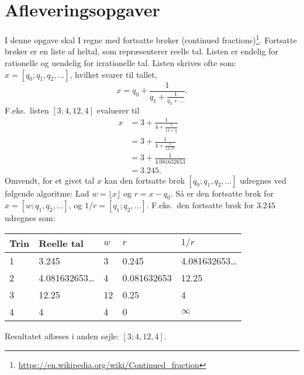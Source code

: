 \documentclass[a4paper,12pt]{article}
\begin{document}
\section*{Afleveringsopgaver}
I denne opgave skal I regne med fortsatte brøker (continued fractions)\footnote{\url{https://en.wikipedia.org/wiki/Continued_fraction}}. Fortsatte brøker er en liste af heltal, som repræsenterer reelle tal. Listen er endelig for rationelle og uendelig for irrationelle tal. Listen skrives ofte som:
$x = [q_0; q_1, q_2, \ldots]$, hvilket svarer til tallet,
\begin{equation}
  x = q_0 + \frac{1}{q_1 + \frac{1}{q_2 + \dots}}.
\end{equation}
F.eks.\ listen $[3;4, 12, 4]$ evaluerer til
\begin{align}
  x &= 3 + \frac{1}{4 + \frac{1}{12 + \frac{1}{4}}}
  \\&=  3 + \frac{1}{4 + \frac{1}{12.25}}
  \\&=  3 + \frac{1}{4.081632653}
  \\&=  3.245.
\end{align}
Omvendt, for et givet tal $x$ kan den fortsatte brøk $[q_0; q_1, q_2, \ldots]$ udregnes ved følgende algoritme: Lad $w = \lfloor x \rfloor$ og $r = x - q_0$. Så er den fortsatte brøk for $x = [w; q_1, q_2, \ldots]$, og $1/r = [q_1; q_2, \ldots]$. F.eks.\ den fortsatte brøk for $3.245$ udregnes som:
\begin{center}
  \begin{tabular}{|l|l|l|l|l|}
    \hline
    Trin & Reelle tal & $w$ & $r$ & $1/r$\\
    \hline
    1 & 3.245 & 3 & 0.245 & 4.081632653\ldots\\
    2 & 4.081632653\ldots & 4 & 0.081632653 & 12.25\\
    3 & 12.25 & 12 & 0.25 & 4\\
    4 & 4 & 4 & 0 & $\infty$\\
    \hline
  \end{tabular}
\end{center}
Resultatet aflæses i anden søjle: $[3; 4, 12, 4]$.
\end{document}
